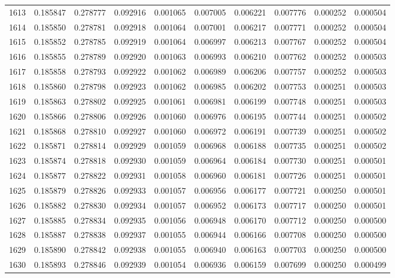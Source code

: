 \begin{tabular}{lrrrrrrrrr}
1613 & 0.185847 & 0.278777 & 0.092916 & 0.001065 & 0.007005 & 0.006221 & 0.007776 & 0.000252 & 0.000504 \\
1614 & 0.185850 & 0.278781 & 0.092918 & 0.001064 & 0.007001 & 0.006217 & 0.007771 & 0.000252 & 0.000504 \\
1615 & 0.185852 & 0.278785 & 0.092919 & 0.001064 & 0.006997 & 0.006213 & 0.007767 & 0.000252 & 0.000504 \\
1616 & 0.185855 & 0.278789 & 0.092920 & 0.001063 & 0.006993 & 0.006210 & 0.007762 & 0.000252 & 0.000503 \\
1617 & 0.185858 & 0.278793 & 0.092922 & 0.001062 & 0.006989 & 0.006206 & 0.007757 & 0.000252 & 0.000503 \\
1618 & 0.185860 & 0.278798 & 0.092923 & 0.001062 & 0.006985 & 0.006202 & 0.007753 & 0.000251 & 0.000503 \\
1619 & 0.185863 & 0.278802 & 0.092925 & 0.001061 & 0.006981 & 0.006199 & 0.007748 & 0.000251 & 0.000503 \\
1620 & 0.185866 & 0.278806 & 0.092926 & 0.001060 & 0.006976 & 0.006195 & 0.007744 & 0.000251 & 0.000502 \\
1621 & 0.185868 & 0.278810 & 0.092927 & 0.001060 & 0.006972 & 0.006191 & 0.007739 & 0.000251 & 0.000502 \\
1622 & 0.185871 & 0.278814 & 0.092929 & 0.001059 & 0.006968 & 0.006188 & 0.007735 & 0.000251 & 0.000502 \\
1623 & 0.185874 & 0.278818 & 0.092930 & 0.001059 & 0.006964 & 0.006184 & 0.007730 & 0.000251 & 0.000501 \\
1624 & 0.185877 & 0.278822 & 0.092931 & 0.001058 & 0.006960 & 0.006181 & 0.007726 & 0.000251 & 0.000501 \\
1625 & 0.185879 & 0.278826 & 0.092933 & 0.001057 & 0.006956 & 0.006177 & 0.007721 & 0.000250 & 0.000501 \\
1626 & 0.185882 & 0.278830 & 0.092934 & 0.001057 & 0.006952 & 0.006173 & 0.007717 & 0.000250 & 0.000501 \\
1627 & 0.185885 & 0.278834 & 0.092935 & 0.001056 & 0.006948 & 0.006170 & 0.007712 & 0.000250 & 0.000500 \\
1628 & 0.185887 & 0.278838 & 0.092937 & 0.001055 & 0.006944 & 0.006166 & 0.007708 & 0.000250 & 0.000500 \\
1629 & 0.185890 & 0.278842 & 0.092938 & 0.001055 & 0.006940 & 0.006163 & 0.007703 & 0.000250 & 0.000500 \\
1630 & 0.185893 & 0.278846 & 0.092939 & 0.001054 & 0.006936 & 0.006159 & 0.007699 & 0.000250 & 0.000499 \\

\end{tabular}
